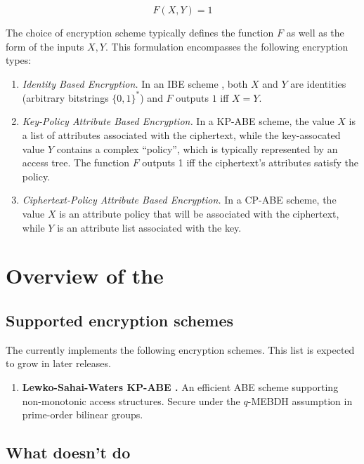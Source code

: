 $$F(X, Y) = 1$$

The choice of encryption scheme typically defines the function $F$ as well as the form of the inputs $X, Y$.  This formulation encompasses the following encryption types:

\begin{enumerate}
\item {\em Identity Based Encryption.}  In an IBE scheme \cite{shamir84,bf01}, both $X$ and $Y$ are identities (arbitrary bitstrings $\{0,1\}^*$) and $F$ outputs $1$ iff $X = Y$.

\item {\em Key-Policy Attribute Based Encryption.}  In a KP-ABE \cite{sw05} scheme, the value $X$ is a list of attributes associated with the ciphertext, while the key-assocated value $Y$ contains a complex ``policy'', which is typically represented by an access tree.  The function $F$ outputs 1 iff the ciphertext's attributes satisfy the policy.

\item {\em Ciphertext-Policy Attribute Based Encryption.}  In a CP-ABE \cite{} scheme, the value $X$ is an attribute policy that will be associated with the ciphertext, while $Y$ is an attribute list associated with the key. 

\end{enumerate}

\section{Overview of the {\libraryname}}

\subsection{Supported encryption schemes}
\label{sec:supportedschemes}

The {\libraryname} currently implements the following encryption schemes.  This list is expected to grow in later releases.

\begin{enumerate}

\item {\bf Lewko-Sahai-Waters KP-ABE \cite{lsw09}.}  An efficient ABE scheme supporting non-monotonic access structures.  Secure under the $q$-MEBDH assumption in prime-order bilinear groups.
\end{enumerate}

\subsection{What {\libraryshort} doesn't do}

